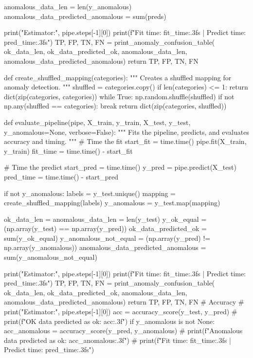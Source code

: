 {{    anomalous_data_len = len(y_anomalous)
    anomalous_data_predicted_anomalous = sum(preds)

    print("Estimator:", pipe.steps[-1][0])
    print(f"Fit time: {fit_time:.3f}s | Predict time: {pred_time:.3f}s")
    TP, FP, TN, FN = print_anomaly_confusion_table(
        ok_data_len, ok_data_predicted_ok, anomalous_data_len, anomalous_data_predicted_anomalous)
    return TP, FP, TN, FN


def create_shuffled_mapping(categories):
    """
    Creates a shuffled mapping for anomaly detection.
    """
    shuffled = categories.copy()
    if len(categories) <= 1:
        return dict(zip(categories, categories))
    while True:
        np.random.shuffle(shuffled)
        if not np.any(shuffled == categories):
            break
    return dict(zip(categories, shuffled))


def evaluate_pipeline(pipe, X_train, y_train, X_test, y_test, y_anomalous=None, verbose=False):
    """
    Fits the pipeline, predicts, and evaluates accuracy and timing.
    """
    # Time the fit
    start_fit = time.time()
    pipe.fit(X_train, y_train)
    fit_time = time.time() - start_fit

    # Time the predict
    start_pred = time.time()
    y_pred = pipe.predict(X_test)
    pred_time = time.time() - start_pred

    if not y_anomalous:
        labels = y_test.unique()
        mapping = create_shuffled_mapping(labels)
        y_anomalous = y_test.map(mapping)

    ok_data_len = anomalous_data_len = len(y_test)
    y_ok_equal = (np.array(y_test) == np.array(y_pred))
    ok_data_predicted_ok = sum(y_ok_equal)
    y_anomalous_not_equal = (np.array(y_pred) != np.array(y_anomalous))
    anomalous_data_predicted_anomalous = sum(y_anomalous_not_equal)

    print("Estimator:", pipe.steps[-1][0])
    print(f"Fit time: {fit_time:.3f}s | Predict time: {pred_time:.3f}s")
    TP, FP, TN, FN = print_anomaly_confusion_table(
        ok_data_len, ok_data_predicted_ok, anomalous_data_len, anomalous_data_predicted_anomalous)
    return TP, FP, TN, FN
    # Accuracy
    # print("Estimator:", pipe.steps[-1][0])
    acc = accuracy_score(y_test, y_pred)
    # print(f"OK data predicted as ok: {acc:.3f}")
    if y_anomalous is not None:
        acc_anomalous = accuracy_score(y_pred, y_anomalous)
    #     print(f"Anomalous data predicted as ok: {acc_anomalous:.3f}")
    # print(f"Fit time: {fit_time:.3f}s | Predict time: {pred_time:.3f}s")

}}
